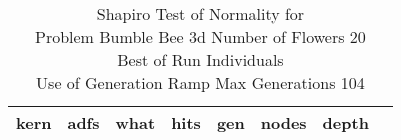 \begin{table}[H]
\caption{Shapiro Test of Normality for \\ Problem  Bumble Bee 3d  Number of Flowers 20\\Best of Run Individuals \\ Use of Generation Ramp  Max Generations 104\\}
\begin{center}
\scalebox{0.8} %
{
\begin{tabular}{lrrrrrrr}
\hline
kern & adfs & what & hits & gen & nodes & depth \\
\hline


\end{tabular}
}
\end{center}
\end{table}

